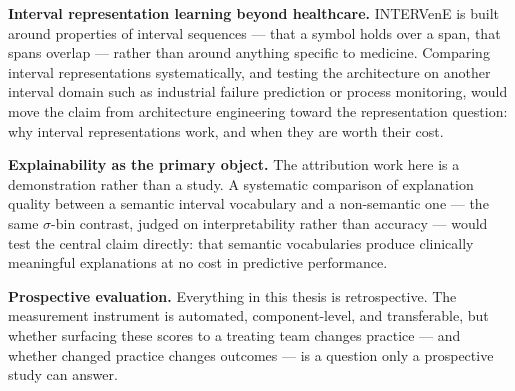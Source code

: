 \textbf{Interval representation learning beyond healthcare.} INTERVenE is built around properties of interval sequences --- that a symbol holds over a span, that spans overlap --- rather than around anything specific to medicine. Comparing interval representations systematically, and testing the architecture on another interval domain such as industrial failure prediction or process monitoring, would move the claim from architecture engineering toward the representation question: why interval representations work, and when they are worth their cost.

\textbf{Explainability as the primary object.} The attribution work here is a demonstration rather than a study. A systematic comparison of explanation quality between a semantic interval vocabulary and a non-semantic one --- the same $\sigma$-bin contrast, judged on interpretability rather than accuracy --- would test the central claim directly: that semantic vocabularies produce clinically meaningful explanations at no cost in predictive performance.

\textbf{Prospective evaluation.} Everything in this thesis is retrospective. The measurement instrument is automated, component-level, and transferable, but whether surfacing these scores to a treating team changes practice --- and whether changed practice changes outcomes --- is a question only a prospective study can answer.
